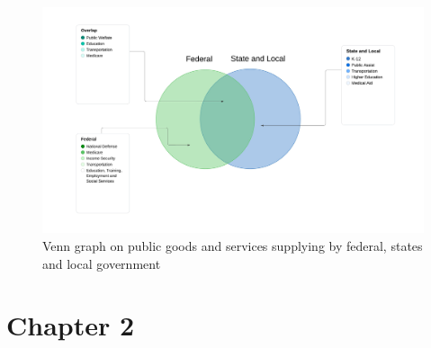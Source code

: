 \begin{figure}[H]
    \centering
    \includegraphics[scale=0.4]{Chapter-1/Figures/Venn graph on public goods.jpeg}
    \caption[Venn graph on public goods and services supplying]{Venn graph on public goods and services supplying by federal, states and local government
        \texttt{} }
    \label{Figure 1.4}
\end{figure}

\clearpage

\section{Chapter 2}


